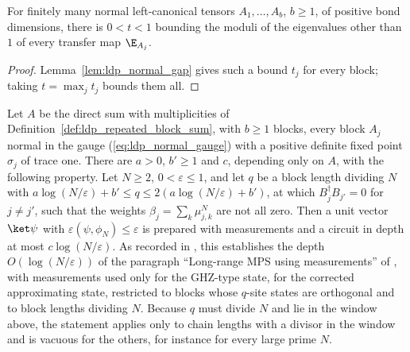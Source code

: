 \begin{lemma}
    \label{lem:ldp_common_gap}
    \leanok
    For finitely many normal left-canonical tensors $A_1,\dots,A_b$, $b\geq1$, of
    positive bond dimensions, there is $0<t<1$ bounding the moduli of the
    eigenvalues other than $1$ of every transfer map $\E_{A_j}$.
\end{lemma}
\begin{proof}
    \leanok
    Lemma~\ref{lem:ldp_normal_gap} gives such a bound $t_j$ for every block;
    taking $t=\max_jt_j$ bounds them all.
\end{proof}

\begin{lemma}
    \label{thm:ldp_long_range_measurement_depth}
    \leanok
    Let $A$ be the direct sum with multiplicities of
    Definition~\ref{def:ldp_repeated_block_sum}, with $b\geq1$ blocks, every
    block $A_j$ normal in the gauge (\ref{eq:ldp_normal_gauge}) with a positive
    definite fixed point $\sigma_j$ of trace one. There are $a>0$, $b'\geq1$ and
    $c$, depending only on $A$, with the following property. Let $N\geq2$,
    $0<\varepsilon\leq1$, and let $q$ be a block length dividing $N$ with
    $a\log(N/\varepsilon)+b'\leq q\leq2(a\log(N/\varepsilon)+b')$, at which
    $B_j^\dagger B_{j'}=0$ for $j\neq j'$, such that the weights
    $\beta_j=\sum_k\mu_{j,k}^N$ are not all zero. Then a unit vector $\ket\psi$
    with $\varepsilon(\psi,\phi_N)\leq\varepsilon$ is prepared with measurements
    and a circuit in depth at most $c\log(N/\varepsilon)$. As recorded in
    \cite{gap:mswc24_measurement_preparation_scope}, this establishes the depth
    $O(\log(N/\varepsilon))$ of the paragraph ``Long-range MPS using
    measurements'' of \cite{Malz2024Preparation}, with measurements used only
    for the GHZ-type state, for the corrected approximating state, restricted to
    blocks whose $q$-site states are orthogonal and to block lengths dividing $N$.
    Because $q$ must divide $N$
    and lie in the window above, the statement applies only to chain lengths
    with a divisor in the window and is vacuous for the others, for instance for
    every large prime $N$.
\end{lemma}
